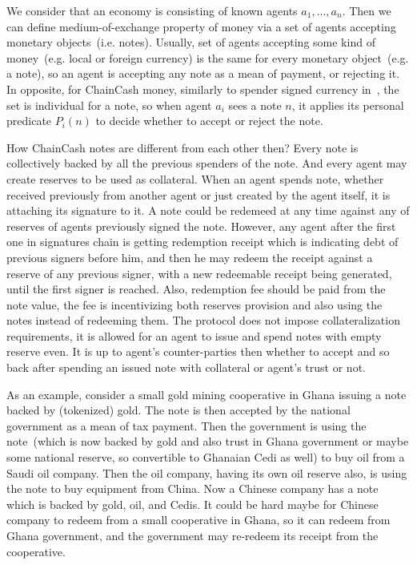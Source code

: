 \documentclass{llncs}   %
\newcommand{\cc}{ChainCash}
\begin{document}
We consider that an economy is consisting of known agents $a_1, ..., a_n$. Then we can define medium-of-exchange property of money via a set of agents accepting monetary objects~(i.e. notes). Usually, set of agents accepting some kind of money~(e.g. local or foreign currency) is the same for every monetary object~(e.g. a note), so an agent is accepting any note as a mean of payment, or rejecting it. In opposite, for \cc{} money, similarly to spender signed currency in~\cite{saito2003peer}, the set is individual for a note, so when agent $a_i$ sees a note $n$, it applies its personal predicate $P_i(n)$ to decide whether to accept or reject the note.

How \cc{} notes are different from each other then? Every note is collectively backed by all the previous spenders of the note. And every agent may create reserves to be used as collateral. When an agent spends note, whether received previously from another agent or just created by the agent itself, it is attaching its signature to it. A note could be redemeed at any time against any of reserves of agents previously signed the note. However, any agent after the first one in signatures chain is getting redemption receipt which is indicating debt of previous signers before him, and then he may redeem the receipt against a reserve of any previous signer, with a new redeemable receipt being generated, until the first signer is reached. Also, redemption fee should be paid from the note value, the fee is incentivizing both reserves provision and also using the notes instead of redeeming them. The protocol does not impose collateralization requirements, it is allowed for an agent to issue and spend notes with empty reserve even. It is up to agent's counter-parties then whether to accept and so back after spending an issued note with collateral or agent's trust or not.

As an example, consider a small gold mining cooperative in Ghana issuing a note backed by (tokenized) gold. The note is then accepted by the national government as a mean of tax payment. Then the government is using the note~(which is now backed by gold and also trust in Ghana government or maybe some national reserve, so convertible to Ghanaian Cedi as well) to buy oil from a Saudi oil company. Then the oil company, having its own oil reserve also, is using the note to buy equipment from China. Now a Chinese company has a note which is backed by gold, oil, and Cedis. It could be hard maybe for Chinese company to redeem from a small cooperative in Ghana, so it can redeem from Ghana government, and the government may re-redeem its receipt from the cooperative.
\end{document}
